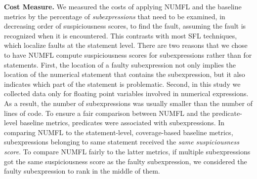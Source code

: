 \documentclass[times]{stvrauth}
\begin{document}
{\bf Cost Measure.}  We measured the costs of applying NUMFL and the baseline metrics by the percentage of {\it subexpressions} that need to be examined, in decreasing order of suspiciousness scores, to find the fault, assuming the fault is recognized when it is encountered.  This contrasts with most SFL techniques, which localize faults at the statement level.  There are two reasons that we chose to have NUMFL compute suspiciousness scores for subexpressions rather than for statements.  First, the location of a faulty subexpression not only implies the location of the numerical statement that contains the subexpression, but it also indicates which part of the statement is problematic.   Second, in this study we collected data only for floating point variables involved in numerical expressions.   As a result, the number of subexpressions was usually smaller than the number of lines of code.  To ensure a fair comparison between NUMFL and the predicate-level baseline metrics, predicates were associated with subexpressions.  In comparing NUMFL to the statement-level, coverage-based baseline metrics, subexpressions belonging to same statement received the {\it same suspiciousness score}.   To compare NUMFL fairly to the latter metrics, if multiple subexpressions got the same suspiciousness score as the faulty subexpression, we considered the faulty subexpression to rank in the middle of them.
\end{document}
